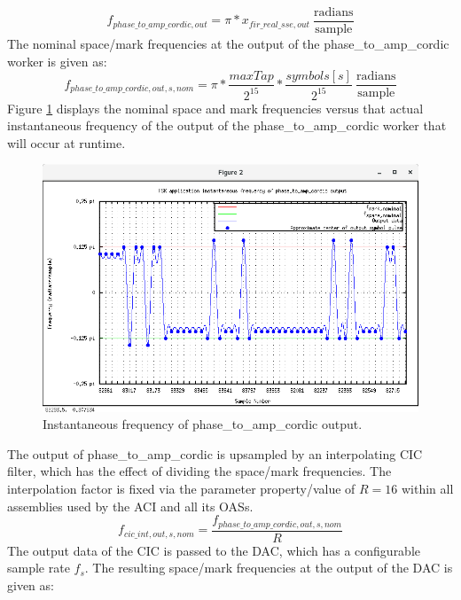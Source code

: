 	\begin{equation} \label{eq:freq_mod}
		f_{phase\_to\_amp\_cordic,out} = \pi * x_{fir\_real\_sse,out} \ \frac{\text{radians}}{\text{sample}}
	\end{equation}
The nominal space/mark frequencies at the output of the phase\_to\_amp\_cordic worker is given as:
	\begin{equation} \label{eq:freq_mod}
		f_{phase\_to\_amp\_cordic,out,s,nom} = \pi * \frac{maxTap}{2^{15}} * \frac{symbols[s]}{2^{15}} \ \frac{\text{radians}}{\text{sample}}
	\end{equation}
Figure \ref{fig:mark_space_freq} displays the nominal space and mark frequencies versus that actual instantaneous frequency of the output of the phase\_to\_amp\_cordic worker that will occur at runtime.
	\begin{figure}[ht]
	 	\centering
	 	\begin{minipage}{0.7\textwidth}
			\centering\includegraphics[trim=0.2cm 0.6cm 0.1cm 2.8cm,clip,width=1.0\linewidth]{mark_space_freq}
			\caption{Instantaneous frequency of phase\_to\_amp\_cordic output.}
			\label{fig:mark_space_freq}
		\end{minipage}
	\end{figure}
The output of phase\_to\_amp\_cordic is upsampled by an interpolating CIC filter, which has the effect of dividing the space/mark frequencies. The interpolation factor is fixed via the parameter property/value of $R=16$ within all assemblies used by the ACI and all its OASs.
	\begin{equation} \label{eq:cic}
		f_{cic\_int,out,s,nom} = \frac{f_{phase\_to\_amp\_cordic,out,s,nom}}{R}
	\end{equation}
The output data of the CIC is passed to the DAC, which has a configurable sample rate $f_s$. The resulting space/mark frequencies at the output of the DAC is given as:
